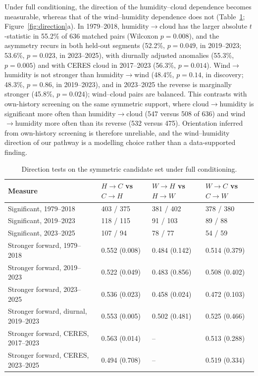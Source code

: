 \documentclass[preprint,12pt]{elsarticle}
\begin{document}
Under full conditioning, the direction of the humidity--cloud dependence becomes measurable, whereas that of the wind--humidity dependence does not (Table~\ref{tab:direction}; Figure~\ref{fig:direction}a). In 1979--2018, humidity$\rightarrow$cloud has the larger absolute $t$-statistic in 55.2\% of 636 matched pairs (Wilcoxon $p=0.008$), and the asymmetry recurs in both held-out segments (52.2\%, $p=0.049$, in 2019--2023; 53.6\%, $p=0.023$, in 2023--2025), with diurnally adjusted anomalies (55.3\%, $p=0.005$) and with CERES cloud in 2017--2023 (56.3\%, $p=0.014$). Wind$\rightarrow$humidity is not stronger than humidity$\rightarrow$wind (48.4\%, $p=0.14$, in discovery; 48.3\%, $p=0.86$, in 2019--2023), and in 2023--2025 the reverse is marginally stronger (45.8\%, $p=0.024$); wind--cloud pairs are balanced. This contrasts with own-history screening on the same symmetric support, where cloud$\rightarrow$humidity is significant more often than humidity$\rightarrow$cloud (547 versus 508 of 636) and wind$\rightarrow$humidity more often than its reverse (532 versus 475). Orientation inferred from own-history screening is therefore unreliable, and the wind--humidity direction of our pathway is a modelling choice rather than a data-supported finding.

\begin{table}[htbp]
\centering
\caption{Direction tests on the symmetric candidate set under full conditioning.}
\label{tab:direction}
\footnotesize
\setlength{\tabcolsep}{3pt}
\begin{tabular}{@{}p{}lll@{}}
\toprule
Measure & $H\rightarrow C$ vs $C\rightarrow H$ & $W\rightarrow H$ vs $H\rightarrow W$ & $W\rightarrow C$ vs $C\rightarrow W$ \\
\midrule
Significant, 1979--2018 & 403 / 375 & 381 / 402 & 378 / 380 \\
Significant, 2019--2023 & 118 / 115 & 91 / 103 & 89 / 88 \\
Significant, 2023--2025 & 107 / 94 & 78 / 77 & 54 / 59 \\
Stronger forward, 1979--2018 & 0.552 (0.008) & 0.484 (0.142) & 0.514 (0.379) \\
Stronger forward, 2019--2023 & 0.522 (0.049) & 0.483 (0.856) & 0.508 (0.402) \\
Stronger forward, 2023--2025 & 0.536 (0.023) & 0.458 (0.024) & 0.472 (0.103) \\
Stronger forward, diurnal, 2019--2023 & 0.553 (0.005) & 0.502 (0.481) & 0.525 (0.466) \\
Stronger forward, CERES, 2017--2023 & 0.563 (0.014) & -- & 0.513 (0.288) \\
Stronger forward, CERES, 2023--2025 & 0.494 (0.708) & -- & 0.519 (0.334) \\
\bottomrule
\end{tabular}
\end{table}
\end{document}
